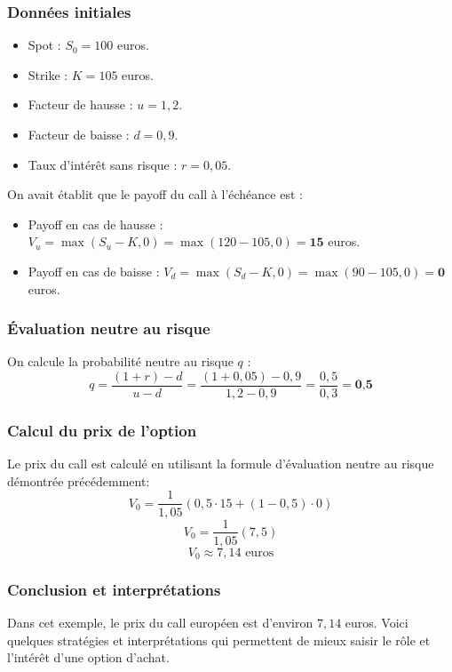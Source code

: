 \documentclass[12pt,a4paper]{article}
\begin{document}
\subsubsection{Données initiales}
\begin{itemize}
    \item Spot : \( S_0 = 100\) euros.
    \item Strike : \( K = 105\) euros.
    \item Facteur de hausse : \( u = 1,2 \).
    \item Facteur de baisse : \( d = 0,9 \).
    \item Taux d'intérêt sans risque : \( r = 0,05 \).
\end{itemize}
On avait établit que le payoff du call à l'échéance est :
\begin{itemize}
    \item Payoff en cas de hausse : \( V_u = \max(S_u - K, 0) = \max(120 - 105, 0) = \textbf{15}\) euros.
    \item Payoff en cas de baisse : \( V_d = \max(S_d - K, 0) = \max(90 - 105, 0) = \textbf{0}\) euros.
\end{itemize}

\subsubsection{Évaluation neutre au risque}
On calcule la probabilité neutre au risque \( q \) :
\[ q = \frac{(1 + r) - d}{u - d} = \frac{(1 + 0,05) - 0,9}{1,2 - 0,9} = \frac{0,5}{0,3} = \textbf{0,5} \]

\subsubsection{Calcul du prix de l'option}
Le prix du call est calculé en utilisant la formule d'évaluation neutre au risque démontrée précédemment:
\[ V_0 = \frac{1}{1,05} \left( 0,5 \cdot 15 + (1 - 0,5) \cdot 0 \right) \]
\[ V_0 = \frac{1}{1,05} \left( 7,5 \right) \]
\[ \boxed{V_0 \approx 7,14 \text{ euros}} \]

\subsubsection{Conclusion et interprétations}

Dans cet exemple, le prix du call européen est d’environ \( 7{,}14 \) euros. Voici quelques stratégies et interprétations qui permettent de mieux saisir le rôle et l’intérêt d’une option d’achat.
\end{document}
